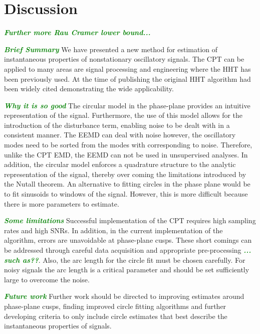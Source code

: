 \documentclass[11pt,draftcls,onecolumn]{IEEEtran}
\newcommand{\dean}[1]{\textsf{\emph{\textbf{\textcolor{green}{#1}}}}}
\begin{document}
\section{Discussion}\label{sect:DiscussionSection}

\dean{Further more Rau Cramer lower bound...}

\dean{Brief Summary}
We have presented a new method for estimation of instantaneous properties of nonstationary oscillatory signals. The CPT can be applied to many areas are signal processing and engineering where the HHT has been previously used. At the time of publishing the original HHT algorithm had been widely cited demonstrating the wide applicability. 

\dean{Why it is so good}
The circular model in the phase-plane provides an intuitive representation of the signal. Furthermore, the use of this model allows for the introduction of the disturbance term, enabling noise to be dealt with in a consistent manner. The EEMD can deal with noise however, the oscillatory modes need to be sorted from the modes with corresponding to noise. Therefore, unlike the CPT EMD, the EEMD can not be used in unsupervised analyses. In addition, the circular model enforces a quadrature structure to the analytic representation of the signal, thereby over coming the limitations introduced by the Nutall theorem. An alternative to fitting circles in the phase plane would be to fit sinusoids to windows of the signal. However, this is more difficult because there is more parameters to estimate. 

\dean{Some limitations}
Successful implementation of the CPT requires high sampling rates and high SNRs. In addition, in the current implementation of the algorithm, errors are unavoidable at phase-plane cusps. These short comings can be addressed through careful data acquisition and appropriate pre-processing \dean{... such as??}. Also, the arc length for the circle fit must be chosen carefully. For noisy signals the arc length is a critical parameter and should be set sufficiently large to overcome the noise. 

\dean{Future work}
Further work should be directed to improving estimates around phase-plane cusps, finding improved circle fitting algorithms and further developing criteria to only include circle estimates that best describe the instantaneous properties of signals.
\end{document}
